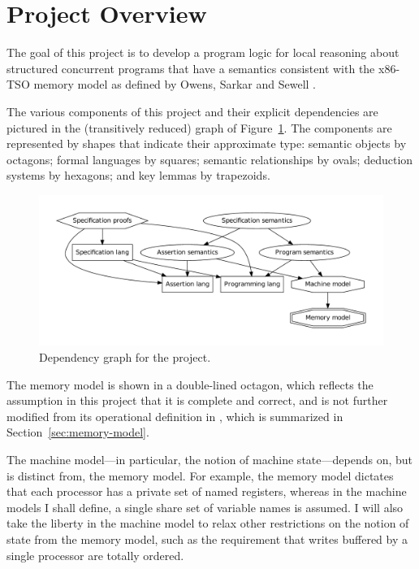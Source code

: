 \documentclass[11pt]{report}
\begin{document}
\section{Project Overview}

The goal of this project is to develop a program logic for local reasoning about structured concurrent programs that have a semantics consistent with the x86-TSO memory model as defined by Owens, Sarkar and Sewell \cite{DBLP:conf/tphol/OwensSS09}. 

The various components of this project and their explicit dependencies are pictured in the (transitively reduced) graph of Figure~\ref{fig:dependency-graph}. The components are represented by shapes that indicate their approximate type: semantic objects by octagons; formal languages by squares; semantic relationships by ovals; deduction systems by hexagons; and key lemmas by trapezoids. 

\begin{figure}[ht]
\begin{center}
\includegraphics[scale=0.5]{dependency-graph/dg-reduced}
\caption{\label{fig:dependency-graph}Dependency graph for the project.}
\end{center}
\end{figure}

The memory model is shown in a double-lined octagon, which reflects the assumption in this project that it is complete and correct, and is not further modified from its operational definition in \cite{DBLP:conf/tphol/OwensSS09}, which is summarized in Section~\ref{sec:memory-model}. 

The machine model---in particular, the notion of machine state---depends on, but is distinct from, the memory model. For example, the memory model dictates that each processor has a private set of named registers, whereas in the machine models I shall define, a single share set of variable names is assumed. I will also take the liberty in the machine model to relax other restrictions on the notion of state from the memory model, such as the requirement that writes buffered by a single processor are totally ordered. 
\end{document}
